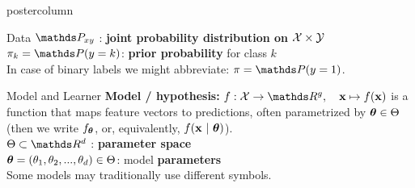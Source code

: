 \documentclass{beamer}
\begin{document}
\begin{frame}[fragile]{}
\begin{columns}
\begin{column}{.31\textwidth}
\begin{beamercolorbox}[center]{postercolumn}
\begin{minipage}{.98\textwidth}
{\begin{myblock}{Data}
$\P_{xy}$ : \textbf{joint probability distribution on} $\mathcal{X} \times \mathcal{Y}$ \\

$\pi_k = \P(y = k)$:\textbf{ prior probability} for class $k$ \\
In case of binary labels we might abbreviate: $\pi = \P(y = 1)$. \\
  
\end{myblock}
\begin{myblock}{Model and Learner}
\textbf{Model / \textbf{hypothesis}: }$f : \Xspace \rightarrow \R^g, \quad \xv \mapsto \fx$ is a function that maps feature vectors to predictions, often parametrized by $\bm{\theta} \in \Theta$ \\ (then we write $f_{\bm{\theta}}$, or, equivalently, $f(\mathbf{x} ~|~ \bm{\theta})$). \\


$\Theta \subset \R^d$ : \textbf{parameter space} \\
  
$\bm{\theta} = (\theta_1, \theta_2, ..., \theta_d) \in \Theta$: model \textbf{parameters}\\
Some models may traditionally use different symbols. \\


\end{myblock}}
\end{minipage}
\end{beamercolorbox}
\end{column}
\end{columns}
\end{frame}
\end{document}
